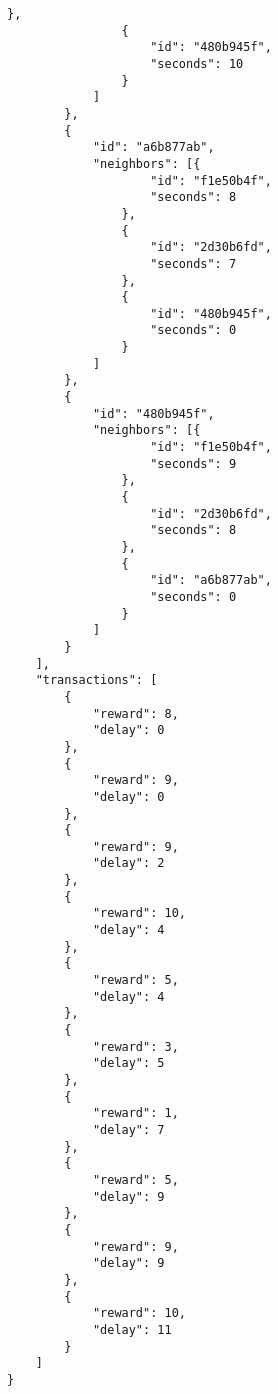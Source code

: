 \begin{lstlisting}[caption={Scenario 2}, label={lst:scenario 2}]
                },
                {
                    "id": "480b945f",
                    "seconds": 10
                }
            ]
        },
        {
            "id": "a6b877ab",
            "neighbors": [{
                    "id": "f1e50b4f",
                    "seconds": 8
                },
                {
                    "id": "2d30b6fd",
                    "seconds": 7
                },
                {
                    "id": "480b945f",
                    "seconds": 0
                }
            ]
        },
        {
            "id": "480b945f",
            "neighbors": [{
                    "id": "f1e50b4f",
                    "seconds": 9
                },
                {
                    "id": "2d30b6fd",
                    "seconds": 8
                },
                {
                    "id": "a6b877ab",
                    "seconds": 0
                }
            ]
        }
    ],
    "transactions": [
        {
            "reward": 8,
            "delay": 0
        },
        {
            "reward": 9,
            "delay": 0
        },
        {
            "reward": 9,
            "delay": 2
        },
        {
            "reward": 10,
            "delay": 4
        },
        {
            "reward": 5,
            "delay": 4
        },
        {
            "reward": 3,
            "delay": 5
        },
        {
            "reward": 1,
            "delay": 7
        },
        {
            "reward": 5,
            "delay": 9
        },
        {
            "reward": 9,
            "delay": 9
        },
        {
            "reward": 10,
            "delay": 11
        }
    ]
}
\end{lstlisting}